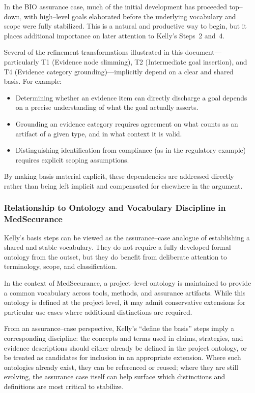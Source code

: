 \documentclass{article}
\begin{document}
In the BIO assurance case, much of the initial development has proceeded top--down, with high--level goals elaborated before the underlying vocabulary and scope were fully stabilized. This is a natural and productive way to begin, but it places additional importance on later attention to Kelly’s Steps~2 and~4.

Several of the refinement transformations illustrated in this document---particularly T1 (Evidence node slimming), T2 (Intermediate goal insertion), and T4 (Evidence category grounding)---implicitly depend on a clear and shared basis. For example:

\begin{itemize}
  \item Determining whether an evidence item can directly discharge a goal depends on a precise understanding of what the goal actually asserts.
  \item Grounding an evidence category requires agreement on what counts as an artifact of a given type, and in what context it is valid.
  \item Distinguishing identification from compliance (as in the regulatory example) requires explicit scoping assumptions.
\end{itemize}

By making basis material explicit, these dependencies are addressed directly rather than being left implicit and compensated for elsewhere in the argument.

\subsubsection{Relationship to Ontology and Vocabulary Discipline in MedSecurance}

Kelly’s basis steps can be viewed as the assurance--case analogue of establishing a shared and stable vocabulary. They do not require a fully developed formal ontology from the outset, but they do benefit from deliberate attention to terminology, scope, and classification.

In the context of MedSecurance, a project--level ontology is maintained to provide a common vocabulary across tools, methods, and assurance artifacts. While this ontology is defined at the project level, it may admit conservative extensions for particular use cases where additional distinctions are required.

From an assurance--case perspective, Kelly’s ``define the basis'' steps imply a corresponding discipline: the concepts and terms used in claims, strategies, and evidence descriptions should either already be defined in the project ontology, or be treated as candidates for inclusion in an appropriate extension. Where such ontologies already exist, they can be referenced or reused; where they are still evolving, the assurance case itself can help surface which distinctions and definitions are most critical to stabilize.
\end{document}
